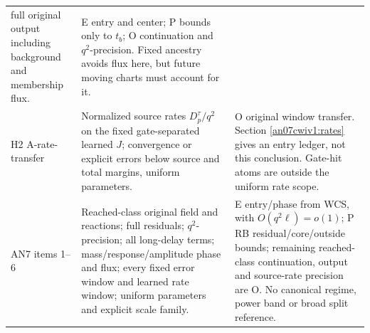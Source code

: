 \documentclass[11pt]{article}
\numberwithin{equation}{section}
\theoremstyle{remark}\newtheorem{remark}[theorem]{Remark}
\begin{document}
\begin{longtable}{>{\raggedright\arraybackslash}p{}>{\raggedright\arraybackslash}p{}>{\raggedright\arraybackslash}p{}}
 full original output including background and membership flux.
& E entry and center; P bounds only to \(t_b\);
 O continuation and \(q^2\)-precision. Fixed ancestry avoids
 flux here, but future moving charts must account for it.\\
H2 A-rate-transfer
& Normalized source rates \(D_p^\tau/q^2\) on the fixed
 gate-separated learned \(J\); convergence or explicit errors
 below source and total margins, uniform parameters.
& O original window transfer. Section \ref{an07cwiv1:rates}
 gives an entry ledger, not this conclusion. Gate-hit atoms
 are outside the uniform rate scope.\\
AN7 items 1--6
& Reached-class original field and reactions; full residuals;
 \(q^2\)-precision; all long-delay terms; mass/response/amplitude
 phase and flux; every fixed error window and learned rate
 window; uniform parameters and explicit scale family.
& E entry/phase from WCS, with \(O(q^2\ell)=o(1)\);
 P RB residual/core/outside bounds; remaining reached-class
 continuation, output and source-rate precision are O.
 No canonical regime, power band or broad split reference.\\
\bottomrule
\end{longtable}\normalsize
\end{document}
